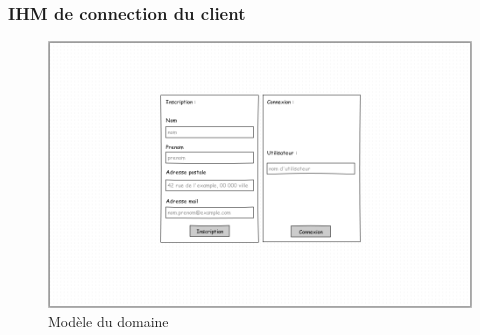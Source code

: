 \documentclass[a4paper,11pt]{article}
\begin{document}
\subsubsection{IHM de connection du client}

\begin{figure}[H]
  \begin{center}
    \includegraphics[width=12cm]{../../IHM/IHM connection utilisateur.png}
    \caption{Modèle du domaine}
  \end{center}
\end{figure}
\end{document}
